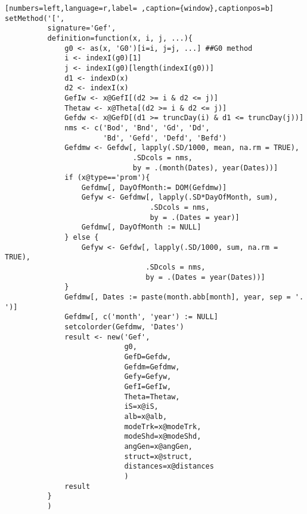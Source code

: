 \begin{lstlisting}[numbers=left,language=r,label= ,caption={window},captionpos=b]
setMethod('[',
          signature='Gef',
          definition=function(x, i, j, ...){
              g0 <- as(x, 'G0')[i=i, j=j, ...] ##G0 method
              i <- indexI(g0)[1]
              j <- indexI(g0)[length(indexI(g0))]
              d1 <- indexD(x)
              d2 <- indexI(x)
              GefIw <- x@GefI[(d2 >= i & d2 <= j)]
              Thetaw <- x@Theta[(d2 >= i & d2 <= j)]
              Gefdw <- x@GefD[(d1 >= truncDay(i) & d1 <= truncDay(j))]
              nms <- c('Bod', 'Bnd', 'Gd', 'Dd',
                       'Bd', 'Gefd', 'Defd', 'Befd')
              Gefdmw <- Gefdw[, lapply(.SD/1000, mean, na.rm = TRUE),
                              .SDcols = nms,
                              by = .(month(Dates), year(Dates))]
              if (x@type=='prom'){
                  Gefdmw[, DayOfMonth:= DOM(Gefdmw)]
                  Gefyw <- Gefdmw[, lapply(.SD*DayOfMonth, sum),
                                  .SDcols = nms,
                                  by = .(Dates = year)]
                  Gefdmw[, DayOfMonth := NULL]
              } else {
                  Gefyw <- Gefdw[, lapply(.SD/1000, sum, na.rm = TRUE),
                                 .SDcols = nms,
                                 by = .(Dates = year(Dates))]
              }
              Gefdmw[, Dates := paste(month.abb[month], year, sep = '. ')]
              Gefdmw[, c('month', 'year') := NULL]
              setcolorder(Gefdmw, 'Dates')
              result <- new('Gef',
                            g0,
                            GefD=Gefdw,
                            Gefdm=Gefdmw,
                            Gefy=Gefyw,
                            GefI=GefIw,
                            Theta=Thetaw,
                            iS=x@iS,
                            alb=x@alb,
                            modeTrk=x@modeTrk,
                            modeShd=x@modeShd,
                            angGen=x@angGen,
                            struct=x@struct,
                            distances=x@distances
                            )
              result
          }
          )



\end{lstlisting}
